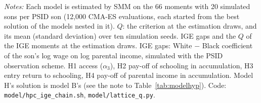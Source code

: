 \begin{table}[!htbp]
\centering
\caption{The hypothesis lattice: fit of every combination of race parameters}
\label{tab:modellattice}
\par\smallskip
\begin{minipage}{\textwidth}\footnotesize \textit{Notes:} Each model is estimated by SMM on the 66 moments with 20 simulated sons per PSID son (12,000 CMA-ES evaluations, each started from the best solution of the models nested in it). $Q$: the criterion at the estimation draws, and its mean (standard deviation) over ten simulation seeds. IGE gaps and the $Q$ of the IGE moments at the estimation draws. IGE gaps: White $-$ Black coefficient of the son's log wage on log parental income, simulated with the PSID observation scheme. H1 access ($\alpha_3$), H2 pay-off of schooling in accumulation, H3 entry return to schooling, H4 pay-off of parental income in accumulation. Model H's solution is model B's (see the note to Table~\ref{tab:modelhyp}). Code: \texttt{model/hpc\_ige\_chain.sh}, \texttt{model/lattice\_q.py}.\end{minipage}
\end{table}
